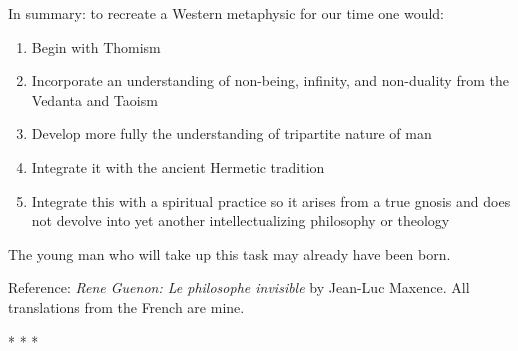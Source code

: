 In summary: to recreate a Western metaphysic for our time one would:

\begin{enumerate}
\item Begin with Thomism 
\item Incorporate an understanding of non-being, infinity, and non-duality from the Vedanta and Taoism 
\item Develop more fully the understanding of tripartite nature of man 
\item Integrate it with the ancient Hermetic tradition 
\item Integrate this with a spiritual practice so it arises from a true gnosis and does not devolve into yet another intellectualizing philosophy or theology 
\end{enumerate}
The young man who will take up this task may already have been born.


\hfill

Reference: \emph{Rene Guenon: Le philosophe invisible} by Jean-Luc Maxence. All translations from the French are mine.


\begin{center}* * *\end{center}

